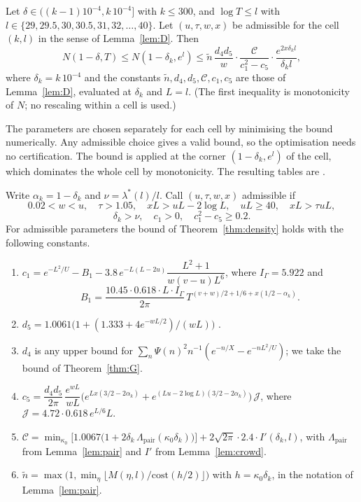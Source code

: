 \begin{theorem}\label{thm:density}
Let $\delta \in ((k-1)10^{-4}, k\,10^{-4}]$ with $k \le 300$, and $\log T \le l$ with $l \in \{29, 29.5, 30, 30.5, 31, 32, \dots, 40\}$.
Let $(u,\tau,w,x)$ be admissible for the cell $(k,l)$ in the sense of Lemma~\ref{lem:D}.
Then
\[
N(1-\delta, T) \le N(1-\delta_k, e^l) \le \tilde n\,\frac{d_4d_5}{w}\cdot\frac{\mathcal C}{c_1^2 - c_5}\cdot\frac{e^{2x\delta_kl}}{\delta_kl},
\]
where $\delta_k = k\,10^{-4}$ and the constants $\tilde n, d_4, d_5, \mathcal C, c_1, c_5$ are those of Lemma~\ref{lem:D}, evaluated at $\delta_k$ and $L = l$.
(The first inequality is monotonicity of $N$; no rescaling within a cell is used.)
\end{theorem}

The parameters are chosen separately for each cell by minimising the bound numerically.
Any admissible choice gives a valid bound, so the optimisation needs no certification.
The bound is applied at the corner $(1-\delta_k, e^l)$ of the cell, which dominates the whole cell by monotonicity.
The resulting tables are .

\begin{lemma}\label{lem:D}
Write $\alpha_k = 1 - \delta_k$ and $\nu = \lambda^*(l)/l$.
Call $(u,\tau,w,x)$ admissible if
\[
0.02 < w < u,\quad \tau > 1.05,\quad xL > uL - 2\log L,\quad uL \ge 40,\quad xL > \tau uL,
\]
\[
\delta_k > \nu,\quad c_1 > 0,\quad c_1^2 - c_5 \ge 0.2 .
\]
For admissible parameters the bound of Theorem~\ref{thm:density} holds with the following constants.
\begin{enumerate}
\item[(i)] $c_1 = e^{-L^2/U} - B_1 - 3.8\,e^{-L(L-2u)}\dfrac{L^2+1}{w(v-u)L^6}$, where $I_\Gamma = 5.922$ and
\[
B_1 = \frac{10.45\cdot 0.618\cdot L\cdot I_\Gamma}{2\pi}\,T^{(v+w)/2 + 1/6 + x(1/2-\alpha_k)} .
\]
\item[(ii)] $d_5 = 1.0061\big(1 + (1.333 + 4e^{-wL/2})/(wL)\big)$ \cite[Lemma~4.3]{Bellotti}.
\item[(iii)] $d_4$ is any upper bound for $\sum_n \Psi(n)^2n^{-1}(e^{-n/X} - e^{-nL^2/U})$; we take the bound of Theorem~\ref{thm:G}.
\item[(iv)] $c_5 = \dfrac{d_4d_5}{2\pi}\,\dfrac{e^{wL}}{wL}\Big(e^{Lx(3/2-2\alpha_k)} + e^{(Lu-2\log L)(3/2-2\alpha_k)}\Big)\,\mathcal J$, where $\mathcal J = 4.72\cdot 0.618\, e^{L/6}L$.
\item[(v)] $\mathcal C = \min_{\kappa_0}\Big[1.0067\big(1 + 2\delta_k\,\Lambda_{\mathrm{pair}}(\kappa_0\delta_k)\big)\Big] + 2\sqrt{2\pi}\cdot 2.4\cdot I'(\delta_k,l)$, with $\Lambda_{\mathrm{pair}}$ from Lemma~\ref{lem:pair} and $I'$ from Lemma~\ref{lem:crowd}.
\item[(vi)] $\tilde n = \max\big(1, \min_\eta\lfloor M(\eta,l)/\mathrm{cost}(h/2)\rfloor\big)$ with $h = \kappa_0\delta_k$, in the notation of Lemma~\ref{lem:pair}.
\end{enumerate}
\end{lemma}

